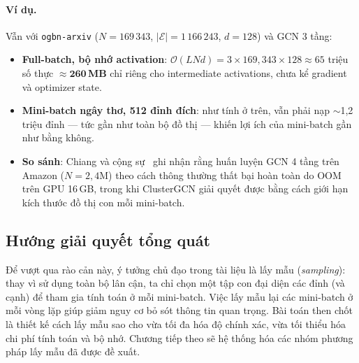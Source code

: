 \paragraph{Ví dụ.} Vẫn với \texttt{ogbn-arxiv} ($N = 169\,343$, $|\mathcal{E}| = 1\,166\,243$, $d = 128$) và GCN 3 tầng:
\begin{itemize}
    \item \textbf{Full-batch, bộ nhớ activation}: $\mathcal{O}(LNd) = 3 \times 169{,}343 \times 128 \approx 65$ triệu số thực $\approx \mathbf{260}$\,\textbf{MB} chỉ riêng cho intermediate activations, chưa kể gradient và optimizer state.
    \item \textbf{Mini-batch ngây thơ, 512 đỉnh đích}: như tính ở trên, vẫn phải nạp $\sim$1,2 triệu đỉnh --- tức gần như toàn bộ đồ thị --- khiến lợi ích của mini-batch gần như bằng không.
    \item \textbf{So sánh}: Chiang và cộng sự~\cite{Chiang2019ClusterGCN} ghi nhận rằng huấn luyện GCN 4 tầng trên Amazon ($N = 2{,}4$M) theo cách thông thường thất bại hoàn toàn do OOM trên GPU 16\,GB, trong khi ClusterGCN giải quyết được bằng cách giới hạn kích thước đồ thị con mỗi mini-batch.
\end{itemize}

\subsection{Hướng giải quyết tổng quát}

Để vượt qua rào cản này, ý tưởng chủ đạo trong tài liệu là lấy mẫu (\textit{sampling}): thay vì sử dụng toàn bộ lân cận, ta chỉ chọn một tập con đại diện các đỉnh (và cạnh) để tham gia tính toán ở mỗi mini-batch. Việc lấy mẫu lại các mini-batch ở mỗi vòng lặp giúp giảm nguy cơ bỏ sót thông tin quan trọng. Bài toán then chốt là thiết kế cách lấy mẫu sao cho vừa tối đa hóa độ chính xác, vừa tối thiểu hóa chi phí tính toán và bộ nhớ. Chương tiếp theo sẽ hệ thống hóa các nhóm phương pháp lấy mẫu đã được đề xuất.
